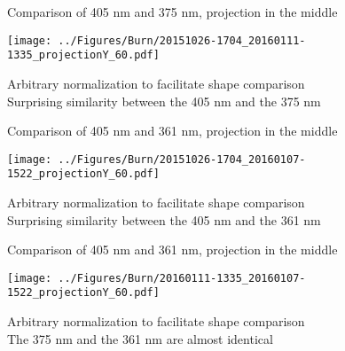 \documentclass[compress,8pt]{beamer} %
\begin{document}
\begin{frame}{Comparison of 405 nm and 375 nm, projection in the middle}
\begin{adjustwidth}{-3em}{-3em}
\begin{center}
\texttt{[image: ../Figures/Burn/20151026-1704\_20160111-1335\_projectionY\_60.pdf]}
\end{center}
\end{adjustwidth}
Arbitrary normalization to facilitate shape comparison \\
Surprising similarity between the 405 nm and the 375 nm \\
\end{frame}



\begin{frame}{Comparison of 405 nm and 361 nm, projection in the middle}
\begin{adjustwidth}{-3em}{-3em}
\begin{center}
\texttt{[image: ../Figures/Burn/20151026-1704\_20160107-1522\_projectionY\_60.pdf]}
\end{center}
\end{adjustwidth}
Arbitrary normalization to facilitate shape comparison \\
Surprising similarity between the 405 nm and the 361 nm \\
\end{frame}



\begin{frame}{Comparison of 405 nm and 361 nm, projection in the middle}
\begin{adjustwidth}{-3em}{-3em}
\begin{center}
\texttt{[image: ../Figures/Burn/20160111-1335\_20160107-1522\_projectionY\_60.pdf]}
\end{center}
\end{adjustwidth}
Arbitrary normalization to facilitate shape comparison \\
The 375 nm and the 361 nm are almost identical \\
\end{frame}



\end{document}
